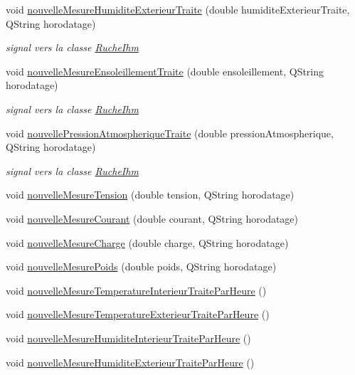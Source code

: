 \begin{DoxyCompactItemize}
void \hyperlink{class_ruche_a9dc15aec6973ca8f565960a51f7f0a6b}{nouvelle\+Mesure\+Humidite\+Exterieur\+Traite} (double humidite\+Exterieur\+Traite, Q\+String horodatage)
\begin{DoxyCompactList}\small\item\em signal vers la classe \hyperlink{class_ruche_ihm}{Ruche\+Ihm} \end{DoxyCompactList}\item 
void \hyperlink{class_ruche_ac0cf9ceae0a82739dbb4c2d33c4a2494}{nouvelle\+Mesure\+Ensoleillement\+Traite} (double ensoleillement, Q\+String horodatage)
\begin{DoxyCompactList}\small\item\em signal vers la classe \hyperlink{class_ruche_ihm}{Ruche\+Ihm} \end{DoxyCompactList}\item 
void \hyperlink{class_ruche_ac55a1301b55166474b700ee0a2a57f22}{nouvelle\+Pression\+Atmospherique\+Traite} (double pression\+Atmospherique, Q\+String horodatage)
\begin{DoxyCompactList}\small\item\em signal vers la classe \hyperlink{class_ruche_ihm}{Ruche\+Ihm} \end{DoxyCompactList}\item 
void \hyperlink{class_ruche_abe4e46c9a1b6e8cfb6adb2e958d9ab83}{nouvelle\+Mesure\+Tension} (double tension, Q\+String horodatage)
\item 
void \hyperlink{class_ruche_a189654383ee5802ccdc4256f2c1171c7}{nouvelle\+Mesure\+Courant} (double courant, Q\+String horodatage)
\item 
void \hyperlink{class_ruche_a3bd0a55bb10880f8753d5c2fdb41651f}{nouvelle\+Mesure\+Charge} (double charge, Q\+String horodatage)
\item 
void \hyperlink{class_ruche_a094d288ac798e0011e29242db0c7a34e}{nouvelle\+Mesure\+Poids} (double poids, Q\+String horodatage)
\item 
void \hyperlink{class_ruche_a5fdf12cb02acc7283f183a7aad906edc}{nouvelle\+Mesure\+Temperature\+Interieur\+Traite\+Par\+Heure} ()
\item 
void \hyperlink{class_ruche_ac0d7e104549abdfa87691618aba6291b}{nouvelle\+Mesure\+Temperature\+Exterieur\+Traite\+Par\+Heure} ()
\item 
void \hyperlink{class_ruche_a02a3e68fd11b208507867ebd0e8dbdc2}{nouvelle\+Mesure\+Humidite\+Interieur\+Traite\+Par\+Heure} ()
\item 
void \hyperlink{class_ruche_aab1ad40a46ab5fe4352a23e4a986856b}{nouvelle\+Mesure\+Humidite\+Exterieur\+Traite\+Par\+Heure} ()

\end{DoxyCompactItemize}
